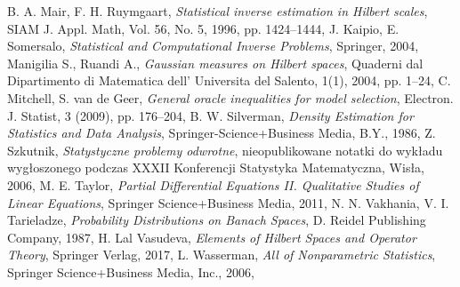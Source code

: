 \documentclass[man,mfiu]{mgrwms}
\begin{document}
\begin{thebibliography}{100}
 B. A. Mair, F. H. Ruymgaart, \emph{Statistical inverse estimation in Hilbert scales}, SIAM J. Appl. Math, Vol. 56, No. 5, 1996, pp. 1424--1444,
J. Kaipio, E. Somersalo, \emph{Statistical and Computational Inverse Problems}, Springer, 2004,
 Manigilia S., Ruandi A., \emph{Gaussian measures on Hilbert spaces}, Quaderni dal Dipartimento di Matematica dell' Universita del Salento, 1(1), 2004, pp. 1--24,
 C. Mitchell, S. van de Geer, \emph{ General oracle inequalities for model selection}, Electron. J. Statist, 3 (2009), pp. 176--204,
 B. W. Silverman, \emph{Density Estimation for Statistics and Data Analysis}, Springer-Science+Business Media, B.Y., 1986,
Z. Szkutnik, \emph{Statystyczne problemy odwrotne}, nieopublikowane notatki do wykładu wygłoszonego podczas XXXII Konferencji Statystyka Matematyczna, Wisła, 2006,
 M. E. Taylor, \emph{Partial Differential Equations II. Qualitative Studies of Linear Equations}, Springer Science+Business Media, 2011,
 N. N. Vakhania, V. I. Tarieladze, \emph{Probability Distributions on Banach Spaces}, D. Reidel Publishing Company, 1987,
H. Lal Vasudeva, \emph{Elements of Hilbert Spaces and Operator Theory}, Springer Verlag, 2017,
L. Wasserman, \emph{All of Nonparametric Statistics},	Springer Science+Business Media, Inc.,	2006,

\end{thebibliography}
\end{document}
